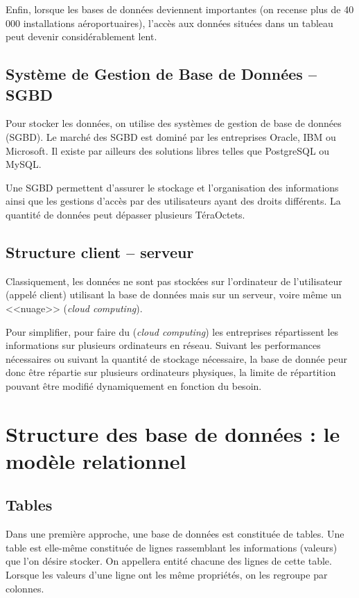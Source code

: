 \documentclass[10pt]{article}
\begin{document}
Enfin, lorsque les bases de données deviennent importantes (on recense plus de 40 000 installations aéroportuaires), l'accès aux données situées dans un tableau peut devenir considérablement lent. 

\subsection{Système de Gestion de Base de Données -- SGBD}
Pour stocker les données, on utilise des systèmes de gestion de base de données (SGBD). Le marché des SGBD est dominé par les entreprises Oracle, IBM ou Microsoft. Il existe par ailleurs des solutions libres telles que PostgreSQL ou MySQL. 

Une SGBD permettent d'assurer le stockage et l'organisation des informations ainsi que les gestions d'accès par des utilisateurs ayant des droits différents. La quantité de données peut dépasser plusieurs TéraOctets.


\subsection{Structure client -- serveur}


Classiquement, les données ne sont pas stockées sur l'ordinateur de l'utilisateur (appelé client) utilisant la base de données mais sur un serveur, voire même un <<nuage>> (\textit{cloud computing}). 

Pour simplifier, pour faire du (\textit{cloud computing}) les entreprises répartissent les informations sur plusieurs ordinateurs en réseau. Suivant les performances nécessaires ou suivant la quantité de stockage nécessaire, la base de donnée peur donc être répartie sur plusieurs ordinateurs physiques, la limite de répartition pouvant être modifié dynamiquement en fonction du besoin. 

\section{Structure des base de données : le modèle relationnel}
\subsection{Tables}
Dans une première approche, une base de données est constituée de tables. Une table est elle-même constituée de lignes rassemblant les informations (valeurs) que l'on désire stocker. On appellera entité chacune des lignes de cette table. Lorsque les valeurs d'une ligne ont les même propriétés, on les regroupe par colonnes. 
\end{document}
